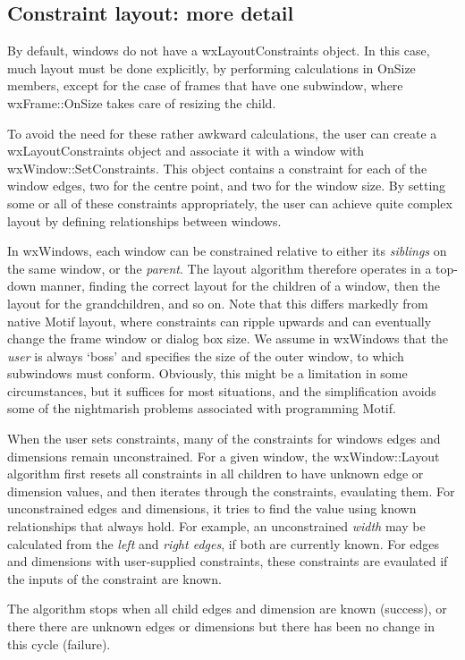 \subsection{Constraint layout: more detail}

By default, windows do not have a wxLayoutConstraints object. In this case, much layout
must be done explicitly, by performing calculations in OnSize members, except
for the case of frames that have one subwindow, where wxFrame::OnSize takes care
of resizing the child.

To avoid the need for these rather awkward calculations, the user can create
a wxLayoutConstraints object and associate it with a window with wxWindow::SetConstraints.
This object contains a constraint for each of the window edges, two for the centre point,
and two for the window size. By setting some or all of these constraints appropriately,
the user can achieve quite complex layout by defining relationships between windows.

In wxWindows, each window can be constrained relative to either its {\it
siblings} on the same window, or the {\it parent}. The layout algorithm
therefore operates in a top-down manner, finding the correct layout for
the children of a window, then the layout for the grandchildren, and so
on. Note that this differs markedly from native Motif layout, where
constraints can ripple upwards and can eventually change the frame
window or dialog box size. We assume in wxWindows that the {\it user} is
always `boss' and specifies the size of the outer window, to which
subwindows must conform. Obviously, this might be a limitation in some
circumstances, but it suffices for most situations, and the
simplification avoids some of the nightmarish problems associated with
programming Motif.

When the user sets constraints, many of the constraints for windows
edges and dimensions remain unconstrained. For a given window,
the wxWindow::Layout algorithm first resets all constraints
in all children to have unknown edge or dimension values, and then iterates through the constraints,
evaulating them. For unconstrained edges and dimensions, it
tries to find the value using known relationships that always hold. For example,
an unconstrained {\it width} may be calculated from the {\it left} and {\it right edges}, if
both are currently known. For edges and dimensions with user-supplied constraints, these
constraints are evaulated if the inputs of the constraint are known.

The algorithm stops when all child edges and dimension are known (success), or there
there are unknown edges or dimensions but there has been no change in this cycle (failure).

